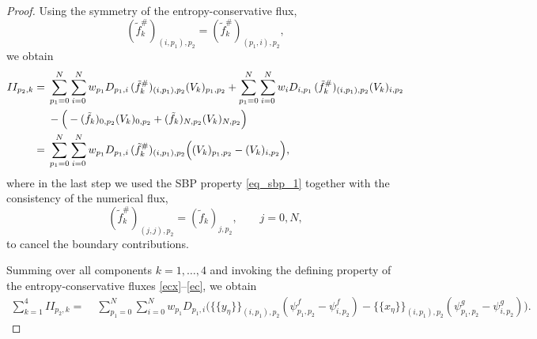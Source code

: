 \documentclass[fleqn,11pt]{amsart}
\begin{document}
{\begin{proof}
Using the symmetry of the entropy-conservative flux,
\[
(\tilde{f}_k^{\#})_{(i,p_1),p_2}
=
(\tilde{f}_k^{\#})_{(p_1,i),p_2},
\]
we obtain
\begin{align*}
II_{p_2,k}
=&\;
\sum_{p_1=0}^N\sum_{i=0}^N
w_{p_1}D_{p_1,i}\,
(\tilde{f}_k^{\#})_{(i,p_1),p_2}(V_k)_{p_1,p_2}
+
\sum_{p_1=0}^N\sum_{i=0}^N
w_iD_{i,p_1}\,
(\tilde{f}_k^{\#})_{(i,p_1),p_2}(V_k)_{i,p_2}\\
&\;
-\Big(
-(\Tilde{f}_k)_{0,p_2}(V_k)_{0,p_2}
+(\Tilde{f}_k)_{N,p_2}(V_k)_{N,p_2}
\Big)\\
=&\;
\sum_{p_1=0}^N\sum_{i=0}^N
w_{p_1}D_{p_1,i}\,
(\tilde{f}_k^{\#})_{(i,p_1),p_2}
\Big(
(V_k)_{p_1,p_2}-(V_k)_{i,p_2}
\Big),
\end{align*}
where in the last step we used the SBP property \eqref{eq_sbp_1} together with the
consistency of the numerical flux,
\[
(\tilde{f}_k^{\#})_{(j,j),p_2}
=
(\tilde{f}_k)_{j,p_2},
\qquad j=0,N,
\]
to cancel the boundary contributions.

Summing over all components $k=1,\dots,4$ and invoking the defining property of
the entropy-conservative fluxes \eqref{ecx}--\eqref{ec}, we obtain
\begin{align*}
\sum_{k=1}^4 II_{p_2,k}
=&\;
\sum_{p_1=0}^N\sum_{i=0}^N
w_{p_1}D_{p_1,i}
\Big(
\{\!\{y_{\eta}\}\!\}_{(i,p_1),p_2}
(\psi^f_{p_1,p_2}-\psi^f_{i,p_2})
-
\{\!\{x_{\eta}\}\!\}_{(i,p_1),p_2}
(\psi^g_{p_1,p_2}-\psi^g_{i,p_2})
\Big).
\end{align*}


\end{proof}}
\end{document}
